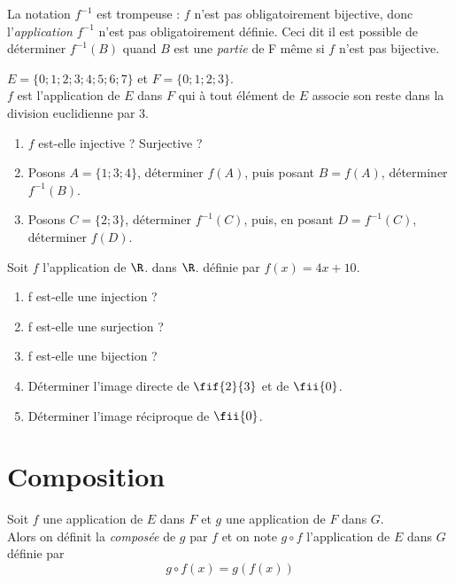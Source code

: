 \begin{remarque}[]
    La notation $f^{-1}$ est trompeuse : $f$ n'est pas obligatoirement bijective, donc l'\textit{application} $f^{-1}$ n'est pas obligatoirement définie. Ceci dit il est possible de déterminer $f^{-1}(B)$ quand $B$ est une \textit{partie} de F même si $f$ n'est pas bijective.
\end{remarque}

\begin{exercice}[]
    $E=\lbrace 0;1;2;3;4;5;6;7\rbrace$ et $F=\lbrace 0;1;2;3\rbrace$.\\
    $f$ est l'application de $E$ dans $F$ qui à tout élément de $E$ associe son reste dans la division euclidienne par 3.
    \begin{enumerate}
        \item 	$f$ est-elle injective ? Surjective ?
        \item 	Posons $A=\lbrace 1;3;4\rbrace$, déterminer $f(A)$, puis posant $B=f(A)$, déterminer $f^{-1}(B)$.
        \item 	Posons $C=\lbrace 2;3\rbrace$, déterminer $f^{-1}(C)$, puis, en posant $D=f^{-1}(C)$, déterminer $f(D)$.\\
    \end{enumerate}
\end{exercice}


\begin{exercice}[]
    Soit $f$ l'application de $\R$. dans $\R$. définie par $f(x) = 4x + 10$.
    \begin{enumerate}
        \item 	f est-elle une injection ?
        \item 	f est-elle une surjection ?
        \item 	f est-elle une bijection ?
        \item 	Déterminer l'image directe de $\fif{2}{3}$ et de $\fii{0}$.
        \item 	Déterminer l'image réciproque de $\fii{0}$.\\
    \end{enumerate}
\end{exercice}


\section{Composition}

\begin{definition}
    Soit $f$ une application de $E$ dans $F$ et $g$ une application de $F$ dans $G$.\\
    Alors on définit la \textit{composée} de $g$ par $f$ et on note $g\circ f$ l'application de $E$ dans $G$ définie par
    $$g\circ f (x)= g\left(f(x)\right)$$
\end{definition}


